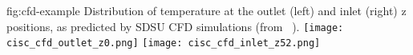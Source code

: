 \begin{dunefigure}{fig:cfd-example}
  {Distribution of temperature at the outlet (left) and inlet (right) z positions, as predicted by SDSU CFD simulations (from ~\cite{docdb-5915}). }
  \texttt{[image: cisc\_cfd\_outlet\_z0.png]}
  \texttt{[image: cisc\_cfd\_inlet\_z52.png]}
\end{dunefigure}
